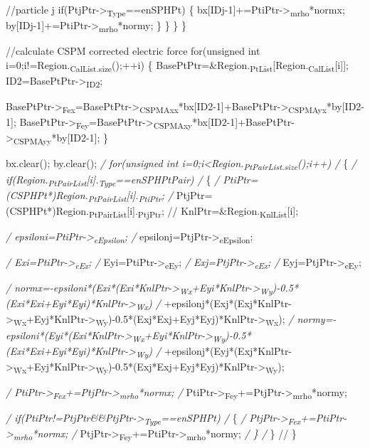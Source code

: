 \documentclass[presentation]{beamer}
\begin{document}
          //particle j
          if(PtjPtr->\textsubscript{Type}==enSPHPt)
            \{
              bx[IDj-1]+=PtiPtr->\textsubscript{mrho}*normx;
              by[IDj-1]+=PtiPtr->\textsubscript{mrho}*normy;
            \}
        \}
    \}
\}

//calculate CSPM corrected electric force
for(unsigned int i=0;i!=Region.\textsubscript{CalList.size}();++i)
  \{
    BasePtPtr=\&Region.\textsubscript{PtList}[Region.\textsubscript{CalList}[i]];
    ID2=BasePtPtr->\textsubscript{ID2};

  BasePtPtr->\textsubscript{Fex}=BasePtPtr->\textsubscript{CSPMAxx}*bx[ID2-1]+BasePtPtr->\textsubscript{CSPMAyx}*by[ID2-1];
  BasePtPtr->\textsubscript{Fey}=BasePtPtr->\textsubscript{CSPMAxy}*bx[ID2-1]+BasePtPtr->\textsubscript{CSPMAyy}*by[ID2-1];
\}

bx.clear();
by.clear();
\emph{/ for(unsigned int i=0;i<Region.\textsubscript{PtPairList.size}();i++)
/}   \{
\emph{/     if(Region.\textsubscript{PtPairList}[i].\textsubscript{Type}==enSPHPtPair)
/}       \{
\emph{/         PtiPtr=(CSPHPt*)Region.\textsubscript{PtPairList}[i].\textsubscript{PtiPtr};
/}         PtjPtr=(CSPHPt*)Region.\textsubscript{PtPairList}[i].\textsubscript{PtjPtr};
//         KnlPtr=\&Region.\textsubscript{KnlList}[i];

\emph{/         epsiloni=PtiPtr->\textsubscript{eEpsilon};
/}         epsilonj=PtjPtr->\textsubscript{eEpsilon};

\emph{/         Exi=PtiPtr->\textsubscript{eEx};
/}         Eyi=PtiPtr->\textsubscript{eEy};
\emph{/         Exj=PtjPtr->\textsubscript{eEx};
/}         Eyj=PtjPtr->\textsubscript{eEy};

\emph{/         normx=-epsiloni*(Exi*(Exi*KnlPtr->\textsubscript{Wx}+Eyi*KnlPtr->\textsubscript{Wy})-0.5*(Exi*Exi+Eyi*Eyi)*KnlPtr->\textsubscript{Wx})
/}           +epsilonj*(Exj*(Exj*KnlPtr->\textsubscript{Wx}+Eyj*KnlPtr->\textsubscript{Wy})-0.5*(Exj*Exj+Eyj*Eyj)*KnlPtr->\textsubscript{Wx});
\emph{/         normy=-epsiloni*(Eyi*(Exi*KnlPtr->\textsubscript{Wx}+Eyi*KnlPtr->\textsubscript{Wy})-0.5*(Exi*Exi+Eyi*Eyi)*KnlPtr->\textsubscript{Wy})
/}           +epsilonj*(Eyj*(Exj*KnlPtr->\textsubscript{Wx}+Eyj*KnlPtr->\textsubscript{Wy})-0.5*(Exj*Exj+Eyj*Eyj)*KnlPtr->\textsubscript{Wy});

\emph{/         PtiPtr->\textsubscript{Fex}+=PtjPtr->\textsubscript{mrho}*normx;
/}         PtiPtr->\textsubscript{Fey}+=PtjPtr->\textsubscript{mrho}*normy;

\emph{/         if(PtiPtr!=PtjPtr\&\&PtjPtr->\textsubscript{Type}==enSPHPt)
/}           \{
\emph{/             PtjPtr->\textsubscript{Fex}+=PtiPtr->\textsubscript{mrho}*normx;
/}             PtjPtr->\textsubscript{Fey}+=PtiPtr->\textsubscript{mrho}*normy;
\emph{/           \}
/}       \}
//   \}
\end{document}
